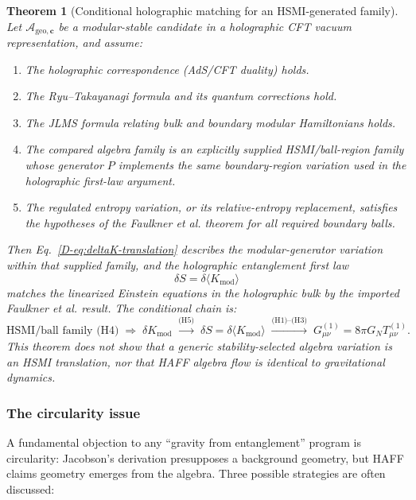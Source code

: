 \documentclass[12pt,a4paper,openany]{book}
\newtheorem{theorem}{Theorem}[chapter]
\begin{document}
\begin{theorem}[Conditional holographic matching for an HSMI-generated family]
\label{D-thm:linearized}
Let $\mathcal{A}_{\mathrm{geo},\mathbf{c}}$ be a modular-stable candidate in a holographic CFT vacuum representation, and assume:
\begin{enumerate}
\item[(H1)] The holographic correspondence (AdS/CFT duality) holds.
\item[(H2)] The Ryu--Takayanagi formula and its quantum corrections hold.
\item[(H3)] The JLMS formula relating bulk and boundary modular Hamiltonians holds.
\item[(H4)] The compared algebra family is an explicitly supplied HSMI/ball-region family whose generator $P$ implements the same boundary-region variation used in the holographic first-law argument.
\item[(H5)] The regulated entropy variation, or its relative-entropy replacement, satisfies the hypotheses of the Faulkner et al. theorem for all required boundary balls.
\end{enumerate}
Then Eq.~\eqref{D-eq:deltaK-translation} describes the modular-generator variation within that supplied family, and the holographic entanglement first law
\begin{equation}
\delta S = \delta\langle K_{\mathrm{mod}}\rangle
\end{equation}
matches the linearized Einstein equations in the holographic bulk by the imported Faulkner et al. result.  The conditional chain is:
\begin{equation}
\text{HSMI/ball family (H4)}
\;\Longrightarrow\;\delta K_{\mathrm{mod}}
\;\xrightarrow{\text{(H5)}}\;
\delta S=\delta\langle K_{\mathrm{mod}}\rangle
\;\xrightarrow{\text{(H1)--(H3)}}\;
G_{\mu\nu}^{(1)}=8\pi G_NT_{\mu\nu}^{(1)}.
\end{equation}
This theorem does not show that a generic stability-selected algebra variation is an HSMI translation, nor that HAFF algebra flow is identical to gravitational dynamics.
\end{theorem}

\subsubsection{The circularity issue}

A fundamental objection to any ``gravity from entanglement'' program is circularity: Jacobson's derivation \cite{Jacobson1995} presupposes a background geometry, but HAFF claims geometry emerges from the algebra.
Three possible strategies are often discussed:
\end{document}
